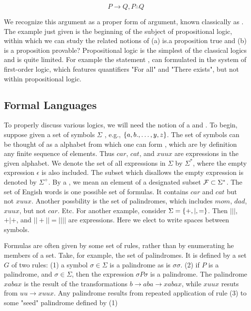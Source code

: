 \begin{equation}
\label{modusponens}
P \to Q, P \therefore Q
\end{equation}

We recognize this argument as a proper form of argument, known classically as .   The example just given is the beginning of the subject of propositional logic, within which we can study the related notions of (a) is.a proposition true and (b) is a proposition provable?  Propositional logic is the simplest of the classical logics and is quite limited.  For example the statement , can formulated in the system of first-order logic, which features quantifiers "For all" and "There exists", but not within propositional logic.



\subsection{Formal Languages}

To properly discuss various logics, we will need the notion of a  and . To begin, suppose given a set of symbols $\Sigma$ , e.g., $\{ a, b., \ldots, y, z \}$. The set of symbols can be thought of as a alphabet from which one can form , which are by definition  any finite sequence of elements.  Thus $car$, $cat$, and $xuux$ are expressions in the given alphabet.  We denote the set of all expressions in $\Sigma$ by $\Sigma^*$, where the empty expression $\epsilon$ is also included.  The subset which disallows the empty expression is denoted by $\Sigma^+$.  By a , we mean an element of a designated subset $\mathcal{F} \subset \Sigma^*$.  The set of Engish words is one possible set of formulas.  It contains $car$ and $cat$ but not $xuux$.  Another possbility is the set of palindromes, which includes $mom$, $dad$, $xuux$, but not $car$.  Etc.  For another example, consider $\Sigma = \{ +, |, = \}$.  Then $|||$, $+ | +$, and $|| + || = ||||$ are expressions.  Here we elect to write spaces between symbols.

Formulas  are often given by some set of rules, rather than by enumerating he members of a set.  Take, for example, the set of palindromes.  It is defined by a set $G$ of two rules: (1) a symbol $\sigma \in \Sigma$ is a palindrome as is $\sigma\sigma$. (2) if $P$ is a palindrome, and $\sigma \in \Sigma$, then the expression $\sigma P \sigma$ is a palindrome.  The palindrome $xabax$ is the result of the transformations $b \to aba \to xabax$, while $xuux$ resuts from $uu \to xuux$.  Any palindrome results from repeated application of rule (3) to some "seed" palindrome defined by (1)

